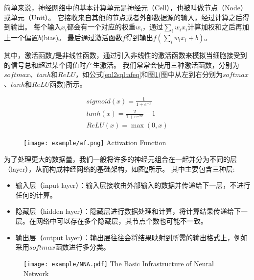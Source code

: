 
简单来说，神经网络中的基本计算单元是神经元（Cell），也被叫做节点（Node）或单元（Unit）。
它接收来自其他的节点或者外部数据源的输入，经过计算之后得到输出。
每个输入$x_i$都会有一个对应的权重$w_i$，通过$\sum_i w_ix_i$计算加权和之后再加上一个偏置$b$(bias)。
最后通过激活函数$f$得到输出$f(\sum_i w_ix_i +b)$。

其中，激活函数$f$是非线性函数，通过引入非线性的激活函数来模拟当细胞接受到的信号总和超过某个阈值时产生激活。
我们常常会使用三种激活函数，分别为$softmax$、$tanh$和$ReLU$，如公式\ref{enl2sql:afeq}和图\ref{fig:af}(图中从左到右分别为$softmax$、$tanh$和$ReLU$函数)所示。

\begin{gather}
  \label{enl2sql:afeq}
  sigmoid(x) = \frac{1}{1 + e^{-x}}\\
  tanh(x) = \frac{2}{1 + e^{-2x}} - 1\\
  ReLU(x) = \max(0,x)
\end{gather}

\begin{figure}[!htp]
  \centering
  \texttt{[image: example/af.png]}
    {Activation Function}
  \label{fig:af}
\end{figure}

为了处理更大的数据量，我们一般将许多的神经元组合在一起并分为不同的层（layer），从而构成神经网络的基础架构，如图\ref{fig:NNA}所示。
其中主要包含三种层:

\begin{itemize}
  \item 输入层（input layer）：输入层接收由外部输入的数据并传递给下一层，不进行任何的计算。
  \item 隐藏层（hidden layer）：隐藏层进行数据处理和计算，将计算结果传递给下一层。在网络中可以存在多个隐藏层，其节点个数也可能不一致。
  \item 输出层（output layer）：输出层往往会将结果映射到所需的输出格式上，例如采用$softmax$函数进行多分类。
\end{itemize}

\begin{figure}[!htp]
  \centering
  \texttt{[image: example/NNA.pdf]}
    {The Basic Infrastructure of Neural Network}
  \label{fig:NNA}
\end{figure}

